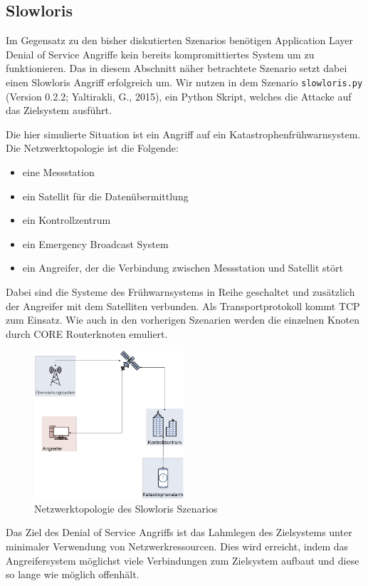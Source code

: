 \documentclass{article}
\begin{document}
\subsection{Slowloris}
Im Gegensatz zu den bisher diskutierten Szenarios benötigen Application Layer Denial of Service Angriffe kein bereits kompromittiertes System um zu funktionieren. Das in diesem Abschnitt näher betrachtete Szenario setzt dabei einen Slowloris Angriff erfolgreich um. Wir nutzen in dem Szenario \texttt{slowloris.py} (Version 0.2.2; Yaltirakli, G., 2015)\cite{gkbrkslowloris}, ein Python Skript, welches die Attacke auf das Zielsystem ausführt.\par
Die hier simulierte Situation ist ein Angriff auf ein Katastrophenfrühwarnsystem. Die Netzwerktopologie ist die Folgende:
\begin{itemize}
\item eine Messstation
\item ein Satellit für die Datenübermittlung
\item ein Kontrollzentrum
\item ein Emergency Broadcast System
\item ein Angreifer, der die Verbindung zwischen Messstation und Satellit stört
\end{itemize}
Dabei sind die Systeme des Frühwarnsystems in Reihe geschaltet und zusätzlich der Angreifer mit dem Satelliten verbunden. Als Transportprotokoll kommt TCP zum Einsatz.
Wie auch in den vorherigen Szenarien werden die einzelnen Knoten durch CORE Routerknoten emuliert.\par
\begin{figure}[h]
\centering
\includegraphics[width=0.5\textwidth]{slowloris}
\caption{Netzwerktopologie des Slowloris Szenarios}
\end{figure}
Das Ziel des Denial of Service Angriffs ist das Lahmlegen des Zielsystems unter minimaler Verwendung von Netzwerkressourcen. Dies wird erreicht, indem das Angreifersystem möglichst viele Verbindungen zum Zielsystem aufbaut und diese so lange wie möglich offenhält.\par
\end{document}
